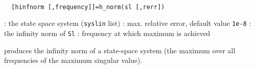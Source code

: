 \begin{mandesc}
   \\ %
\end{mandesc}
\begin{calling_sequence}
\begin{verbatim}
  [hinfnorm [,frequency]]=h_norm(sl [,rerr])  
\end{verbatim}
\end{calling_sequence}
\begin{parameters}
  \begin{varlist}
    : the state space system (\verb!syslin! list)
    : max. relative error, default value \verb!1e-8!
    : the infinity norm of \verb!Sl!
    : frequency at which maximum is achieved
  \end{varlist}
\end{parameters}
\begin{mandescription}
  produces the infinity norm  of a state-space system 
  (the maximum over all frequencies of the maximum singular value).
\end{mandescription}
\begin{manseealso}
      
\end{manseealso}
